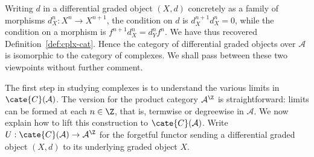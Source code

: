Writing $d$ in a differential graded object $(X,d)$ concretely as a family
of morphisms $d_X^n:X^n\to X^{n+1}$, the condition on $d$ is
$d_X^{n+1}d_X^n=0$, while the condition on a morphism is
$f^{n+1}d_X^n=d_Y^nf^n$. We have thus recovered
Definition~\ref{def:cplx-cat}. Hence the category of differential graded
objects over $\mathcal{A}$ is isomorphic to the category of complexes. We
shall pass between these two viewpoints without further comment.

The first step in studying complexes is to understand the various limits in
$\cate{C}(\mathcal{A})$. The version for the product category
$\mathcal{A}^{\Z}$ is straightforward: limits can be formed at each
$n\in\Z$, that is, termwise or degreewise in $\mathcal{A}$. We now explain
how to lift this construction to $\cate{C}(\mathcal{A})$. Write
$U:\cate{C}(\mathcal{A})\to\mathcal{A}^{\Z}$ for the forgetful functor
sending a differential graded object $(X,d)$ to its underlying graded object
$X$.

